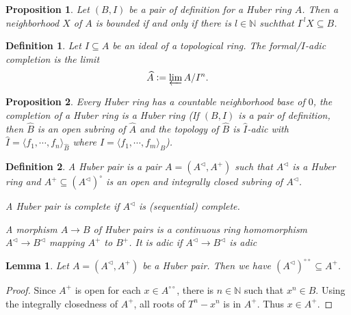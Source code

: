 \documentclass[8pt]{article}
\numberwithin{equation}{section}
\newtheorem{proposition}{Proposition}[subsection]
\newtheorem{definition}{Definition}[subsection]
\newtheorem{lemma}{Lemma}[subsection]
\newcommand{\defeq}{\vcentcolon=}
\newcommand{\N}[0]{\mathbb{N}}
\newcommand{\dcirc}[0]{{\circ\circ}}
\begin{document}
\begin{proposition}
    \label{fact_17_9}
    Let $(B,I)$ be a pair of definition for a Huber ring $A$. Then a neighborhood $X$ of $A$ is bounded if and only if there is $l\in\N$ suchthat $I^{\cdot l}X\subseteq B$.%
\end{proposition}

\begin{definition}
    Let $I\subseteq A$ be an ideal of a topological ring. The formal/$I$-adic completion is the limit 
    \begin{equation}
        \widehat{A} \defeq \varprojlim A/I^n.
    \end{equation}
\end{definition}

\begin{proposition}
    \label{fact_17_10}
    Every Huber ring has a countable neighborhood base of $0$, the completion of a Huber ring is a Huber ring (If $(B,I)$ is a pair of definition, then $\widehat{B}$ is an open subring of $\widehat{A}$ and the topology of $\widehat{B}$ is $\widehat{I}$-adic with $\widehat{I}=\langle f_1,\cdots,f_n\rangle_{\widehat{B}}$ where $I= \langle f_1,\cdots,f_m\rangle_B$).
\end{proposition}

\begin{definition}
    \label{definition_17_4}
    A Huber pair %
    is a pair $A=(A^{\triangleleft},A^+)$ such that $A^{\triangleleft}$ is a Huber ring and $A^+\subseteq (A^{\triangleleft})^\circ$ is an open and integrally closed subring of $A^{\triangleleft}$.
    \par A Huber pair is complete if $A^{\triangleleft}$ is (sequential) complete.
    \par A morphism $A\to B$ of Huber pairs is a continuous ring homomorphism $A^\triangleleft\to B^\triangleleft$ mapping $A^+$ to $B^+$. It is adic if $A^\triangleleft\to B^\triangleleft$ is adic
\end{definition}

\begin{lemma}
    Let $A = (A^\triangleleft, A^+)$ be a Huber pair. Then we have $(A^\triangleleft)^\dcirc\subseteq A^+$.
\end{lemma}
\begin{proof}
    Since $A^+$ is open for each $x\in A^\dcirc$, there is $n\in \N$ such that $x^n\in B$. Using the integrally closedness of $A^+$, all roots of $T^n-x^n$ is in $A^+$. Thus $x\in A^+$.
\end{proof}
\end{document}
